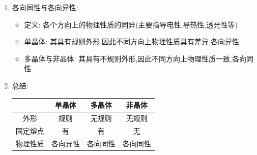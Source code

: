 \documentclass{article}
\begin{document}
\begin{enumerate}
    \item 各向同性与各向异性:
          \begin{itemize}
              \item 定义: 各个方向上的物理性质的同异(主要指导电性,导热性,透光性等)
              \item 单晶体: 其具有规则外形,因此不同方向上物理性质具有差异,各向异性
              \item 多晶体与非晶体: 其具有不规则外形,因此不同方向上物理性质一致,各向同性
          \end{itemize}

    \item 总结:

          \hspace{3em}\begin{tabular}{|c|c|c|c|}
              \hline
                   & 单晶体  & 多晶体  & 非晶体  \\
              \hline
              外形   & 规则   & 无规则  & 无规则  \\
              \hline
              固定熔点 & 有    & 有    & 无    \\
              \hline
              物理性质 & 各向异性 & 各向同性 & 各向同性 \\
              \hline
          \end{tabular}
\end{enumerate}
\end{document}
